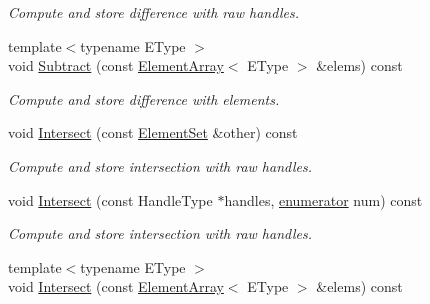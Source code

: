 \begin{DoxyCompactItemize}
\begin{DoxyCompactList}\small\item\em Compute and store difference with raw handles. \end{DoxyCompactList}\item 
\hypertarget{classINMOST_1_1ElementSet_aa4a51ad66c30dbc1d55618a25901599e}{{\footnotesize template$<$typename E\-Type $>$ }\\void \hyperlink{classINMOST_1_1ElementSet_aa4a51ad66c30dbc1d55618a25901599e}{Subtract} (const \hyperlink{classINMOST_1_1ElementArray}{Element\-Array}$<$ E\-Type $>$ \&elems) const }\label{classINMOST_1_1ElementSet_aa4a51ad66c30dbc1d55618a25901599e}

\begin{DoxyCompactList}\small\item\em Compute and store difference with elements. \end{DoxyCompactList}\item 
\hypertarget{classINMOST_1_1ElementSet_a038b4d38d59f5d955fe54edffec42b02}{void \hyperlink{classINMOST_1_1ElementSet_a038b4d38d59f5d955fe54edffec42b02}{Intersect} (const \hyperlink{classINMOST_1_1ElementSet}{Element\-Set} \&other) const }\label{classINMOST_1_1ElementSet_a038b4d38d59f5d955fe54edffec42b02}

\begin{DoxyCompactList}\small\item\em Compute and store intersection with raw handles. \end{DoxyCompactList}\item 
\hypertarget{classINMOST_1_1ElementSet_ad16933df1e7aca014a50062e93f571b9}{void \hyperlink{classINMOST_1_1ElementSet_ad16933df1e7aca014a50062e93f571b9}{Intersect} (const Handle\-Type $\ast$handles, \hyperlink{classINMOST_1_1Storage_ae333dfced6fa9cfde0c8e7dcf1b0cc2b}{enumerator} num) const }\label{classINMOST_1_1ElementSet_ad16933df1e7aca014a50062e93f571b9}

\begin{DoxyCompactList}\small\item\em Compute and store intersection with raw handles. \end{DoxyCompactList}\item 
\hypertarget{classINMOST_1_1ElementSet_a361a4f92a43b559c554554cf7492670a}{{\footnotesize template$<$typename E\-Type $>$ }\\void \hyperlink{classINMOST_1_1ElementSet_a361a4f92a43b559c554554cf7492670a}{Intersect} (const \hyperlink{classINMOST_1_1ElementArray}{Element\-Array}$<$ E\-Type $>$ \&elems) const }\label{classINMOST_1_1ElementSet_a361a4f92a43b559c554554cf7492670a}


\end{DoxyCompactItemize}
